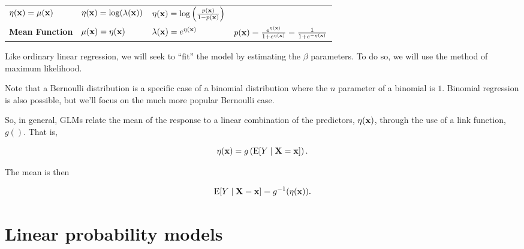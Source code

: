 \documentclass[]{book}
\begin{document}
\begin{longtable}[]{@{}llll@{}}
\begin{minipage}[t]{0.21\columnwidth}
\(\eta({\bf x}) = \mu({\bf x})\)\strut
\end{minipage} & \begin{minipage}[t]{0.23\columnwidth}\raggedright
\(\eta({\bf x}) = \log(\lambda({\bf x}))\)\strut
\end{minipage} & \begin{minipage}[t]{0.24\columnwidth}\raggedright
\(\eta({\bf x}) = \log \left(\frac{p({\bf x})}{1 - p({\bf x})} \right)\)\strut
\end{minipage}\tabularnewline
\begin{minipage}[t]{0.20\columnwidth}\raggedright
\textbf{Mean Function}\strut
\end{minipage} & \begin{minipage}[t]{0.21\columnwidth}\raggedright
\(\mu({\bf x}) = \eta({\bf x})\)\strut
\end{minipage} & \begin{minipage}[t]{0.23\columnwidth}\raggedright
\(\lambda({\bf x}) = e^{\eta({\bf x})}\)\strut
\end{minipage} & \begin{minipage}[t]{0.24\columnwidth}\raggedright
\(p({\bf x}) = \frac{e^{\eta({\bf x})}}{1 + e^{\eta({\bf x})}} = \frac{1}{1 + e^{-\eta({\bf x})}}\)\strut
\end{minipage}\tabularnewline
\bottomrule
\end{longtable}

Like ordinary linear regression, we will seek to ``fit'' the model by
estimating the \(\beta\) parameters. To do so, we will use the method of
maximum likelihood.

Note that a Bernoulli distribution is a specific case of a binomial
distribution where the \(n\) parameter of a binomial is \(1\). Binomial
regression is also possible, but we'll focus on the much more popular
Bernoulli case.

So, in general, GLMs relate the mean of the response to a linear
combination of the predictors, \(\eta({\bf x})\), through the use of a
link function, \(g()\). That is,

\[
\eta({\bf x}) = g\left(\text{E}[Y \mid {\bf X} = {\bf x}]\right).
\]

The mean is then

\[
\text{E}[Y \mid {\bf X} = {\bf x}] = g^{-1}(\eta({\bf x})).
\]

\hypertarget{linear-probability-models}{%
\section{Linear probability models}\label{linear-probability-models}}
\end{document}

